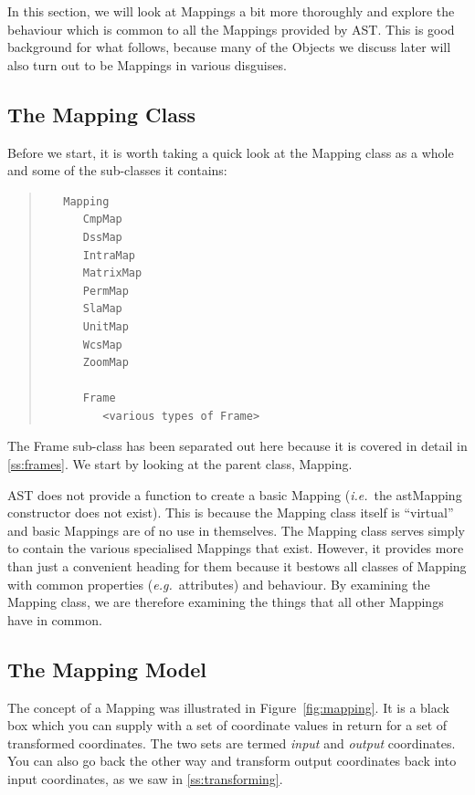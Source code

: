 \documentclass[twoside,11pt]{article}
\newcommand{\htmlref}[2]{#1}
\newcommand{\secref}[1]{\S\ref{#1}}
\renewcommand{\secref}[1]{\ref{#1}}
\begin{document}
In this section, we will look at Mappings a bit more thoroughly and
explore the behaviour which is common to all the Mappings provided by
AST.  This is good background for what follows, because many of the
Objects we discuss later will also turn out to be Mappings in various
disguises.

\subsection{\label{ss:mappingclass}The Mapping Class}

Before we start, it is worth taking a quick look at the \htmlref{Mapping}{Mapping} class
as a whole and some of the sub-classes it contains:

\begin{quote}
\begin{verbatim}
   Mapping
      CmpMap
      DssMap
      IntraMap
      MatrixMap
      PermMap
      SlaMap
      UnitMap
      WcsMap
      ZoomMap

      Frame
         <various types of Frame>
\end{verbatim}
\end{quote}

The \htmlref{Frame}{Frame} sub-class has been separated out here because it is covered
in detail in \secref{ss:frames}. We start by looking at the parent
class, Mapping.

AST does not provide a function to create a basic Mapping
({\em{i.e.}}\ the astMapping constructor does not exist). This is
because the Mapping class itself is ``virtual'' and basic Mappings are
of no use in themselves. The Mapping class serves simply to contain
the various specialised Mappings that exist.
However, it provides more than just a convenient heading for them
because it bestows all classes of Mapping with common properties
({\em{e.g.}}\ attributes) and behaviour.  By examining the Mapping
class, we are therefore examining the things that all other Mappings
have in common.

\subsection{The Mapping Model}

The concept of a \htmlref{Mapping}{Mapping} was illustrated in Figure~\ref{fig:mapping}.
It is a black box which you can supply with a set of coordinate values
in return for a set of transformed coordinates. The two sets are
termed {\em{input}} and {\em{output}} coordinates. You can also go
back the other way and transform output coordinates back into input
coordinates, as we saw in \secref{ss:transforming}.
\end{document}
